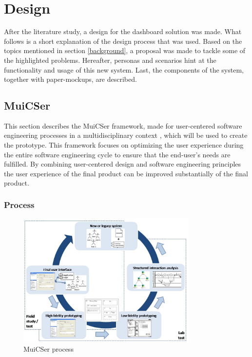 \section{Design} \label{design}

After the literature study, a design for the dashboard solution was made. What follows is a short explanation of the design process that was used. Based on the topics mentioned in section \ref{background}, a proposal was made to tackle some of the highlighted problems. Hereafter, personas and scenarios hint at the functionality and usage of this new system. Last, the components of the system, together with paper-mockups, are described.

    \subsection{MuiCSer} \label{2_muicser}
    This section describes the MuiCSer framework, made for user-centered software engineering processes in a multidisciplinary context \cite{muicser}, which will be used to create the prototype. This framework focuses on optimizing the user experience during the entire software engineering cycle to ensure that the end-user's needs are fulfilled. By combining user-centered design and software engineering principles the user experience of the final product can be improved substantially of the final product.

        \subsubsection{Process}
        
        \begin{figure}[!t]
            \centering
            \includegraphics[width=0.8\textwidth]{chapters/3_design/muicser}
            \caption{MuiCSer process}\label{fig:muicser}
        \end{figure}

